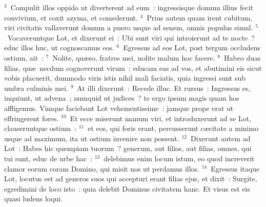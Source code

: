 ${}^{3}$~Compulit illos oppido ut diverterent ad eum~: ingressisque domum illius fecit convivium, et coxit azyma, et comederunt.
${}^{4}$~Prius autem quam irent cubitum, viri civitatis vallaverunt domum a puero usque ad senem, omnis populus simul.
${}^{5}$~Vocaveruntque Lot, et dixerunt ei~: Ubi sunt viri qui introierunt ad te nocte~? educ illos huc, ut cognoscamus eos.
${}^{6}$~Egressus ad eos Lot, post tergum occludens ostium, ait~:
${}^{7}$~Nolite, qu\ae so, fratres mei, nolite malum hoc facere.
${}^{8}$~Habeo duas filias, qu\ae\ necdum cognoverunt virum~: educam eas ad vos, et abutimini eis sicut vobis placuerit, dummodo viris istis nihil mali faciatis, quia ingressi sunt sub umbra culminis mei.
${}^{9}$~At illi dixerunt~: Recede illuc. Et rursus~: Ingressus es, inquiunt, ut advena~; numquid ut judices~? te ergo ipsum magis quam hos affligemus. Vimque faciebant Lot vehementissime~: jamque prope erat ut effringerent fores.
${}^{10}$~Et ecce miserunt manum viri, et introduxerunt ad se Lot, clauseruntque ostium~:
${}^{11}$~et eos, qui foris erant, percusserunt c\ae citate a minimo usque ad maximum, ita ut ostium invenire non possent.
${}^{12}$~Dixerunt autem ad Lot~: Habes hic quempiam tuorum~? generum, aut filios, aut filias, omnes, qui tui sunt, educ de urbe hac~:
${}^{13}$~delebimus enim locum istum, eo quod increverit clamor eorum coram Domino, qui misit nos ut perdamus illos.
${}^{14}$~Egressus itaque Lot, locutus est ad generos suos qui accepturi erant filias ejus, et dixit~: Surgite, egredimini de loco isto~: quia delebit Dominus civitatem hanc. Et visus est eis quasi ludens loqui.


